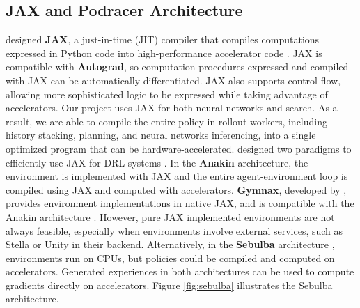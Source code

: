 \subsection{JAX and Podracer Architecture} \label{sec:jax_and_podracer}
\citeauthor{CompilingMachineLearning_Frostig.Johnson.ea_2018} designed \textbf{JAX}, a just-in-time (JIT) compiler that compiles computations expressed in Python code into high-performance accelerator code \cite{CompilingMachineLearning_Frostig.Johnson.ea_2018}.
JAX is compatible with \textbf{Autograd}, so computation procedures expressed and compiled with JAX can be automatically differentiated.
JAX also supports control flow, allowing more sophisticated logic to be expressed while taking advantage of accelerators.
Our project uses JAX for both neural networks and search.
As a result, we are able to compile the entire policy in rollout workers, including history stacking, planning, and neural networks inferencing, into a single optimized program that can be hardware-accelerated.
\citeauthor{PodracerArchitecturesScalable_Hessel.Kroiss.ea_2021} designed two paradigms to efficiently use JAX for DRL systems \cite{PodracerArchitecturesScalable_Hessel.Kroiss.ea_2021}.
In the \textbf{Anakin} architecture, the environment is implemented with JAX and the entire agent-environment loop is compiled using JAX and computed with accelerators.
\textbf{Gymnax}, developed by \citeauthor{GymnaxJAXbasedReinforcement_RobertTjarkoLange_2022}, provides environment implementations in native JAX, and is compatible with the Anakin architecture \cite{GymnaxJAXbasedReinforcement_RobertTjarkoLange_2022}.
However, pure JAX implemented environments are not always feasible, especially when environments involve external services, such as Stella or Unity in their backend.
Alternatively, in the \textbf{Sebulba} architecture \cite{PodracerArchitecturesScalable_Hessel.Kroiss.ea_2021}, environments run on CPUs, but policies could be compiled and computed on accelerators.
Generated experiences in both architectures can be used to compute gradients directly on accelerators.
Figure \ref{fig:sebulba} illustrates the Sebulba architecture.
